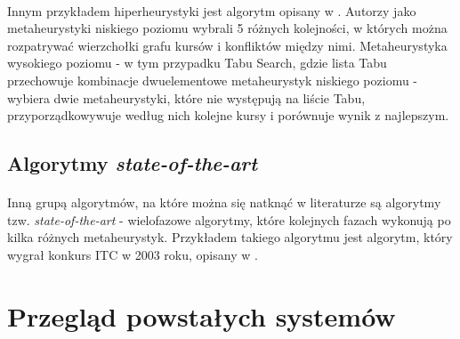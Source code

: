 \paragraph{}Innym przykładem hiperheurystyki jest algorytm opisany w \cite{gbhh}. Autorzy jako metaheurystyki niskiego poziomu wybrali 5 różnych kolejności, w których można rozpatrywać wierzchołki grafu kursów i konfliktów między nimi. Metaheurystyka wysokiego poziomu - w tym przypadku Tabu Search, gdzie lista Tabu przechowuje kombinacje dwuelementowe metaheurystyk niskiego poziomu - wybiera dwie metaheurystyki, które nie występują na liście Tabu, przyporządkowywuje według nich kolejne kursy i porównuje wynik z najlepszym.

\subsection{Algorytmy \textit{state-of-the-art}}

\paragraph{} Inną grupą algorytmów, na które można się natknąć w literaturze są algorytmy tzw. \textit{state-of-the-art} - wielofazowe algorytmy, które kolejnych fazach wykonują po kilka różnych metaheurystyk. Przykładem takiego algorytmu jest algorytm, który wygrał konkurs ITC w 2003 roku, opisany w \cite{kostuch}.



\section{Przegląd powstałych systemów}



